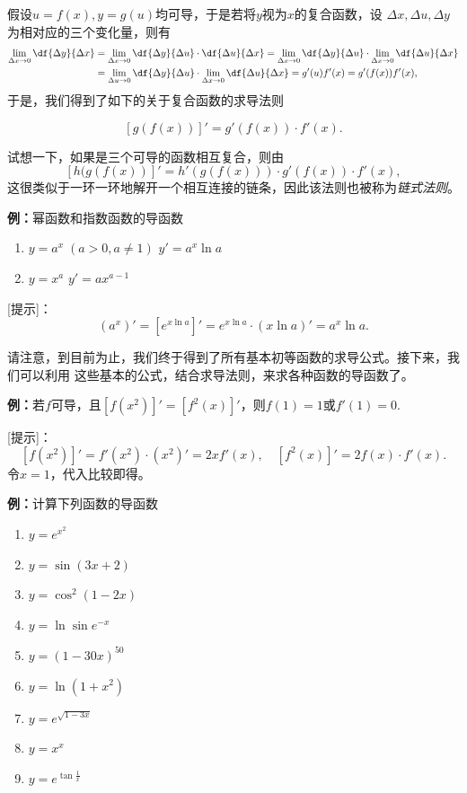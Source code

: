 假设$u=f(x),y=g(u)$均可导，于是若将$y$视为$x$的复合函数，设
$\Delta x,\Delta u,\Delta y$为相对应的三个变化量，则有
\begin{align*}
	\lim\limits_{\Delta x\to 0}\df{\Delta y}{\Delta x}
	&=\lim\limits_{\Delta x\to 0}\df{\Delta y}{\Delta u}
	\cdot\df{\Delta u}{\Delta x}
	=\lim\limits_{\Delta x\to 0}\df{\Delta y}{\Delta u}
	\cdot\lim\limits_{\Delta x\to 0}\df{\Delta u}{\Delta x}\\
	&=\lim\limits_{\Delta u\to 0}\df{\Delta y}{\Delta u}
	\cdot\lim\limits_{\Delta x\to 0}\df{\Delta u}{\Delta x}
	=g'(u)f'(x)=g'(f(x))f'(x),
\end{align*}
于是，我们得到了如下的关于复合函数的求导法则
\begin{thx}
	$$[g(f(x))]'=g'(f(x))\cdot f'(x).$$
\end{thx}
试想一下，如果是三个可导的函数相互复合，则由
$$[h(g(f(x))]'=h'(g(f(x)))\cdot g'(f(x))\cdot f'(x),$$
这很类似于一环一环地解开一个相互连接的链条，因此该法则也被称为{\it 链式法则}。


{\bf 例：}幂函数和指数函数的导函数
\begin{thx}
	\begin{enumerate}[(1)]
	  \item $y=a^x\;(a>0,a\ne 1)$ \hfill $y'=a^x\ln a$ 
	  \item $y=x^a$ \hfill $y'=ax^{a-1}$
	\end{enumerate}
\end{thx}

[提示]：
$$(a^x)'=[e^{x\ln a}]'=e^{x\ln a}\cdot (x\ln a)'=a^x\ln a.$$

请注意，到目前为止，我们终于得到了所有基本初等函数的求导公式。接下来，我们可以利用
这些基本的公式，结合求导法则，来求各种函数的导函数了。

{\bf 例：}若$f$可导，且$[f(x^2)]'=[f^2(x)]'$，则$f(1)=1$或$f'(1)=0$.

[提示]：
$$[f(x^2)]'=f'(x^2)\cdot (x^2)'=2xf'(x),
\quad [f^2(x)]'=2f(x)\cdot f'(x).$$
令$x=1$，代入比较即得。

{\bf 例：}计算下列函数的导函数
\begin{enumerate}[(1)]
  \setlength{\itemindent}{1cm}
  \item $y=e^{x^2}$ 
  \item $y=\sin (3x+2)$ 
  \item $y=\cos^2(1-2x)$ 
  \item $y=\ln\sin e^{-x}$ 
  \item $y=(1-30x)^{50}$ 
  \item $y=\ln(1+x^2)$ 
  \item $y=e^{\sqrt{1-3x}}$ 
  \item $y=x^x$ 
  \item $y=e^{\tan\frac 1x}$
\end{enumerate}

